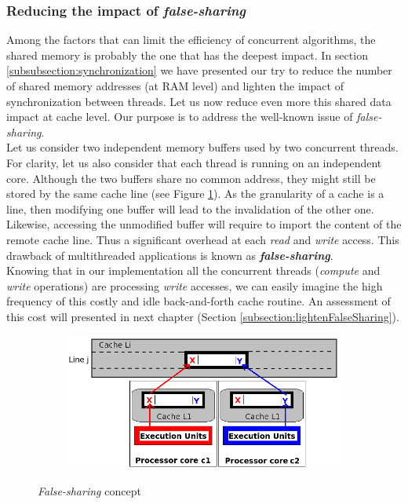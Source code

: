 		\subsubsection{Reducing the impact of \emph{false-sharing}}\label{subsubsection:lightenFalseSharing_concept}
			Among the factors that can limit the efficiency of concurrent algorithms, the shared memory is probably the one that has the deepest impact.   In section \ref{subsubsection:synchronization} we have presented our try to reduce the number of shared memory addresses (at RAM level) and lighten the impact of synchronization between threads.   Let us now reduce even more this shared data impact at cache level.   Our purpose is to address the well-known issue of \emph{false-sharing}.\\

			Let us consider two independent memory buffers used by two concurrent threads.   For clarity, let us also consider that each thread is running on an independent core.   Although the two buffers share no common address, they might still be stored by the same cache line (see Figure \ref{fig:falseSharing_concecpt}).   As the granularity of a cache is a line, then modifying one buffer will lead to the invalidation of the other one.   Likewise, accessing the unmodified buffer will require to import the content of the remote cache line.   Thus a significant overhead at each \emph{read} and \emph{write} access.   This drawback of multithreaded applications is known as \textbf{\textit{false-sharing}}.\\
			Knowing that in our implementation all the concurrent threads (\emph{compute} and \emph{write} operations) are processing \emph{write} accesses, we can easily imagine the high frequency of this costly and idle back-and-forth cache routine.   An assessment of this cost will presented in next chapter (Section \ref{subsection:lightenFalseSharing}).\\

				\begin{figure}[!h]
					\centering
					\begin{subfigure}[b]{0.55\textwidth}
						\centering
						\includegraphics[width=\textwidth]{charts/falseSharing_concecpt.png}
					\end{subfigure}
					\caption{\emph{False-sharing} concept}
					\label{fig:falseSharing_concecpt}
				\end{figure}

